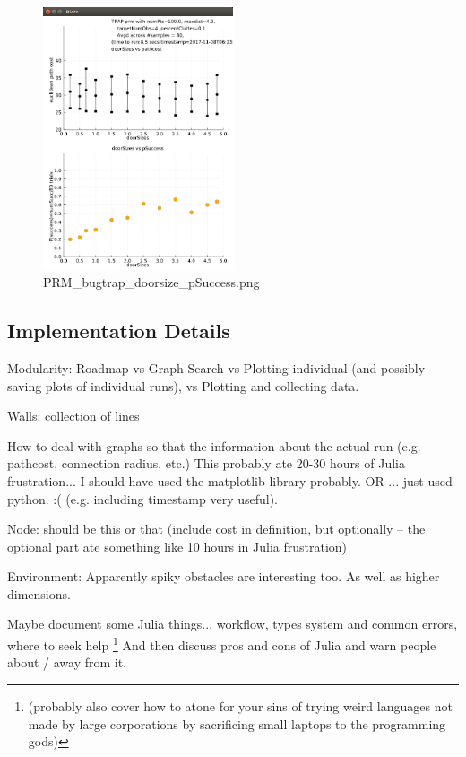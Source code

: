 \documentclass[a4paper]{article}
\begin{document}
 
 
 
 
\begin{figure} \centering
    \includegraphics[width=0.5\textwidth]{PRM_bugtrap_doorsize_pSuccess.png}
     \caption{PRM\_bugtrap\PRM\_doorsize\_pSuccess.png} 
 \end{figure}
 
 
 
 
 
    \subsection{Implementation Details}

    Modularity: Roadmap vs Graph Search vs Plotting individual (and possibly
    saving plots of individual runs), vs Plotting and collecting data.

    Walls: collection of lines

    How to deal with graphs so that the information about the actual run (e.g.
    pathcost, connection radius, etc.)
    This probably ate 20-30 hours of Julia frustration... I should have used the
    matplotlib library probably. OR ... just used python. :(
    (e.g. including timestamp very useful).

    Node: should be this or that (include cost in definition, but optionally --
    the optional part ate something like 10 hours in Julia frustration)

    Environment: Apparently spiky obstacles are interesting too. As well as
    higher dimensions.

    Maybe document some Julia things... workflow, types system and common
    errors, where to seek help \footnote{(probably also cover how to atone for your sins of trying weird
    languages not made by large corporations by sacrificing small laptops to the
    programming gods)} And then discuss pros and cons of Julia and warn people about / away from it.
\end{document}
